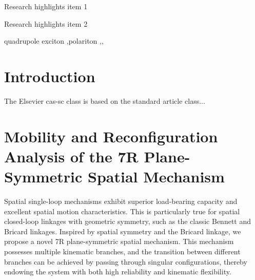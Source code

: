 \documentclass[a4paper,fleqn]{cas-sc}
\begin{document}



\begin{abstract}
This template helps you to create a properly formatted \LaTeX\ manuscript.
\end{abstract}

\begin{graphicalabstract}
\end{graphicalabstract}

\begin{highlights}
\item Research highlights item 1
\item Research highlights item 2
\end{highlights}

\begin{keywords}
quadrupole exciton \sep polariton \sep \WGM \sep \BEC
\end{keywords}

\maketitle


\section{Introduction}

The Elsevier cas-sc class is based on the standard article class...

\section{Mobility and Reconfiguration Analysis of the 7R Plane-Symmetric Spatial Mechanism}
Spatial single-loop mechanisms exhibit superior load-bearing capacity and excellent spatial motion characteristics. This is particularly true for spatial closed-loop linkages with geometric symmetry, such as the classic Bennett and Bricard linkages. Inspired by spatial symmetry and the Bricard linkage, we propose a novel 7R plane-symmetric spatial mechanism. This mechanism possesses multiple kinematic branches, and the transition between different branches can be achieved by passing through singular configurations, thereby endowing the system with both high reliability and kinematic flexibility. 
\end{document}
